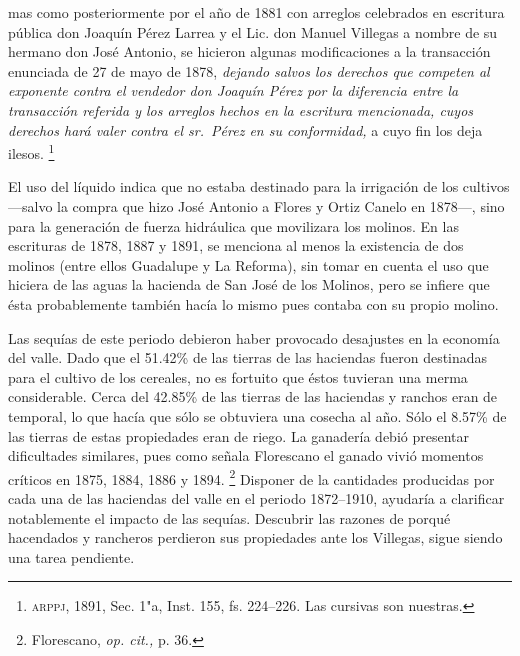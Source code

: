 \documentclass[14pt,twoside,final]{extbook} %
\let\oldfootnote\footnote
\renewcommand\footnote[1]{%
\oldfootnote{\hspace{1mm}#1}}
\begin{document}
\begin{quoting}
mas como posteriormente por el año de 1881 con arreglos celebrados en escritura pública don Joaquín Pérez Larrea y el Lic. don Manuel Villegas a nombre de su hermano don José Antonio, se hicieron algunas modificaciones a la transacción enunciada de 27 de mayo de 1878, \emph{dejando salvos los derechos que competen al exponente contra el vendedor don Joaquín Pérez por la diferencia entre la transacción referida y los arreglos hechos en la escritura mencionada, cuyos derechos hará valer contra el sr.~Pérez en su conformidad,} a cuyo fin los deja ilesos.\footnote{\textsc{arppj}, 1891, Sec. 1"a, Inst. 155, fs. 224--226. Las cursivas son nuestras.}
\end{quoting}
El uso del líquido indica que no estaba destinado para la irrigación de los cultivos ---salvo la compra que hizo José Antonio a Flores y Ortiz Canelo en 1878---, sino para la generación de fuerza hidráulica que movilizara los molinos. En las escrituras de 1878, 1887 y 1891, se menciona al menos la existencia de dos molinos (entre ellos Guadalupe y La Reforma), sin tomar en cuenta el uso que hiciera de las aguas la hacienda de San José de los Molinos, pero se infiere que ésta probablemente también hacía lo mismo pues contaba con su propio molino.

Las sequías de este periodo debieron haber provocado desajustes en la economía del valle. Dado que el 51.42\% de las tierras de las haciendas fueron destinadas para el cultivo de los cereales, no es fortuito que éstos tuvieran una merma considerable. Cerca del 42.85\% de las tierras de las haciendas y ranchos eran de temporal, lo que hacía que sólo se obtuviera una cosecha al año. Sólo el 8.57\% de las tierras de estas propiedades eran de riego. La ganadería debió presentar dificultades similares, pues como señala Florescano el ganado vivió momentos críticos en 1875, 1884, 1886 y 1894.\footnote{Florescano, \emph{op. cit.,} p. 36.} Disponer de la cantidades producidas por cada una de las haciendas del valle en el periodo 1872--1910, ayudaría a clarificar notablemente el impacto de las sequías. Descubrir las razones de porqué hacendados y rancheros perdieron sus propiedades ante los Villegas, sigue siendo una tarea pendiente.
\end{document}
